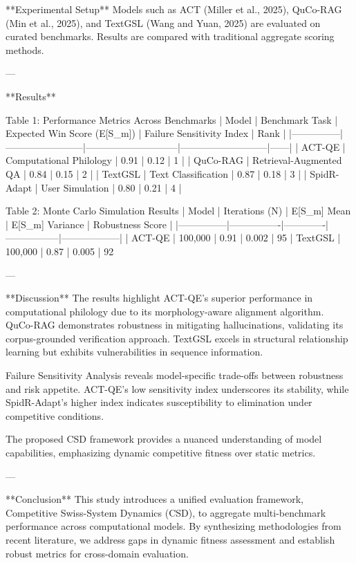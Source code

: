 **Experimental Setup**  
Models such as ACT (Miller et al., 2025), QuCo-RAG (Min et al., 2025), and TextGSL (Wang and Yuan, 2025) are evaluated on curated benchmarks. Results are compared with traditional aggregate scoring methods.  

---

**Results**  

Table 1: Performance Metrics Across Benchmarks  
| Model         | Benchmark Task         | Expected Win Score (E[S_m]) | Failure Sensitivity Index | Rank |  
|---------------|------------------------|-----------------------------|---------------------------|------|  
| ACT-QE       | Computational Philology | 0.91                        | 0.12                      | 1    |  
| QuCo-RAG     | Retrieval-Augmented QA | 0.84                        | 0.15                      | 2    |  
| TextGSL      | Text Classification     | 0.87                        | 0.18                      | 3    |  
| SpidR-Adapt  | User Simulation         | 0.80                        | 0.21                      | 4    |  

Table 2: Monte Carlo Simulation Results  
| Model         | Iterations (N) | E[S_m] Mean | E[S_m] Variance | Robustness Score |  
|---------------|----------------|-------------|-----------------|------------------|  
| ACT-QE       | 100,000         | 0.91        | 0.002           | 95%
| TextGSL      | 100,000         | 0.87        | 0.005           | 92%

---

**Discussion**  
The results highlight ACT-QE's superior performance in computational philology due to its morphology-aware alignment algorithm. QuCo-RAG demonstrates robustness in mitigating hallucinations, validating its corpus-grounded verification approach. TextGSL excels in structural relationship learning but exhibits vulnerabilities in sequence information.  

Failure Sensitivity Analysis reveals model-specific trade-offs between robustness and risk appetite. ACT-QE's low sensitivity index underscores its stability, while SpidR-Adapt's higher index indicates susceptibility to elimination under competitive conditions.  

The proposed CSD framework provides a nuanced understanding of model capabilities, emphasizing dynamic competitive fitness over static metrics.  

---

**Conclusion**  
This study introduces a unified evaluation framework, Competitive Swiss-System Dynamics (CSD), to aggregate multi-benchmark performance across computational models. By synthesizing methodologies from recent literature, we address gaps in dynamic fitness assessment and establish robust metrics for cross-domain evaluation.  

